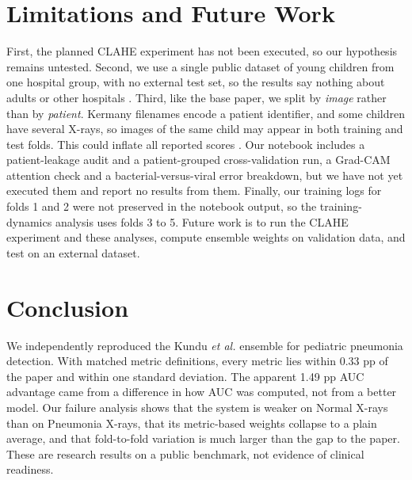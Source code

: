 \documentclass[conference]{IEEEtran}
\begin{document}
\section{Limitations and Future Work}
First, the planned CLAHE experiment has not been executed, so our hypothesis remains untested. Second, we use a single public dataset of young children from one hospital group, with no external test set, so the results say nothing about adults or other hospitals \cite{zech}. Third, like the base paper, we split by \textit{image} rather than by \textit{patient}. Kermany filenames encode a patient identifier, and some children have several X-rays, so images of the same child may appear in both training and test folds. This could inflate all reported scores \cite{roberts}. Our notebook includes a patient-leakage audit and a patient-grouped cross-validation run, a Grad-CAM attention check and a bacterial-versus-viral error breakdown, but we have not yet executed them and report no results from them. Finally, our training logs for folds 1 and 2 were not preserved in the notebook output, so the training-dynamics analysis uses folds 3 to 5. Future work is to run the CLAHE experiment and these analyses, compute ensemble weights on validation data, and test on an external dataset.

\section{Conclusion}
We independently reproduced the Kundu \textit{et al.} ensemble for pediatric pneumonia detection. With matched metric definitions, every metric lies within 0.33 pp of the paper and within one standard deviation. The apparent 1.49 pp AUC advantage came from a difference in how AUC was computed, not from a better model. Our failure analysis shows that the system is weaker on Normal X-rays than on Pneumonia X-rays, that its metric-based weights collapse to a plain average, and that fold-to-fold variation is much larger than the gap to the paper. These are research results on a public benchmark, not evidence of clinical readiness.
\end{document}
